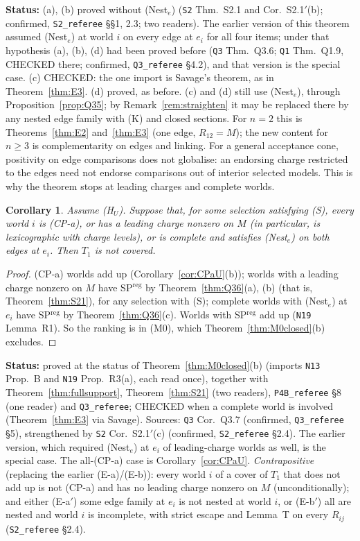 \documentclass[11pt]{article}
\newtheorem{corollary}[theorem]{Corollary}
\theoremstyle{definition}
\theoremstyle{remark}
\newcommand{\src}[1]{\texttt{#1}}
\newcommand{\status}[1]{\par\smallskip\noindent\textbf{Status:} #1\par\smallskip}
\begin{document}
\status{(a), (b) proved without (Nest$_e$) (\src{S2} Thm.~S2.1 and Cor.~S2.1$'$(b); confirmed, \src{S2\_referee} \S\S1, 2.3; two readers). The earlier version of this theorem assumed (Nest$_e$) at world $i$ on every edge at $e_i$ for all four items; under that hypothesis (a), (b), (d) had been proved before (\src{Q3} Thm.~Q3.6; \src{Q1} Thm.~Q1.9, CHECKED there; confirmed, \src{Q3\_referee} \S4.2), and that version is the special case. (c) CHECKED: the one import is Savage's theorem, as in Theorem~\ref{thm:E3}. (d) proved, as before. (c) and (d) still use (Nest$_e$), through Proposition~\ref{prop:Q35}; by Remark~\ref{rem:straighten} it may be replaced there by any nested edge family with (K) and closed sections. For $n=2$ this is Theorems~\ref{thm:E2} and~\ref{thm:E3} (one edge, $R_{12}=M$); the new content for $n\ge3$ is complementarity on edges and linking. For a general acceptance cone, positivity on edge comparisons does not globalise: an endorsing charge restricted to the edges need not endorse comparisons out of interior selected models. This is why the theorem stops at leading charges and complete worlds.}

\begin{corollary}\label{cor:Q37}
Assume (H$_U$). Suppose that, for some selection satisfying (S), every world $i$ is (CP-a), or has a leading charge nonzero on $M$ (in particular, is lexicographic with charge levels), or is complete and satisfies (Nest$_e$) on both edges at $e_i$. Then $T_1$ is not covered.
\end{corollary}
\begin{proof}
(CP-a) worlds add up (Corollary~\ref{cor:CPaU}(b)); worlds with a leading charge nonzero on $M$ have SP$^{\mathrm{reg}}$ by Theorem~\ref{thm:Q36}(a), (b) (that is, Theorem~\ref{thm:S21}), for any selection with (S); complete worlds with (Nest$_e$) at $e_i$ have SP$^{\mathrm{reg}}$ by Theorem~\ref{thm:Q36}(c). Worlds with SP$^{\mathrm{reg}}$ add up (\src{N19} Lemma~R1). So the ranking is in (M0), which Theorem~\ref{thm:M0closed}(b) excludes.
\end{proof}
\status{proved at the status of Theorem~\ref{thm:M0closed}(b) (imports \src{N13} Prop.~B and \src{N19} Prop.~R3(a), each read once), together with Theorem~\ref{thm:fullsupport}, Theorem~\ref{thm:S21} (two readers), \src{P4B\_referee} \S8 (one reader) and \src{Q3\_referee}; CHECKED when a complete world is involved (Theorem~\ref{thm:E3} via Savage). Sources: \src{Q3} Cor.~Q3.7 (confirmed, \src{Q3\_referee} \S5), strengthened by \src{S2} Cor.~S2.1$'$(c) (confirmed, \src{S2\_referee} \S2.4). The earlier version, which required (Nest$_e$) at $e_i$ of leading-charge worlds as well, is the special case. The all-(CP-a) case is Corollary~\ref{cor:CPaU}. \emph{Contrapositive} (replacing the earlier (E-a)/(E-b)): every world $i$ of a cover of $T_1$ that does not add up is not (CP-a) and has no leading charge nonzero on $M$ (unconditionally); and either (E-a$'$) some edge family at $e_i$ is not nested at world $i$, or (E-b$'$) all are nested and world $i$ is incomplete, with strict escape and Lemma~T on every $R_{ij}$ (\src{S2\_referee} \S2.4).}
\end{document}
